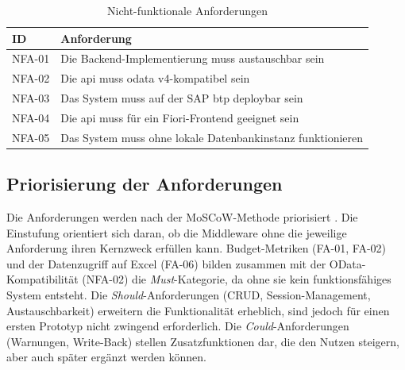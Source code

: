 \begin{table}[H]
\centering
\caption{Nicht-funktionale Anforderungen}
\label{tab:nfa}
\begin{tabularx}{\textwidth}{l>{\raggedright\arraybackslash}X}
\toprule
\textbf{ID} & \textbf{Anforderung} \\
\midrule
NFA-01 & Die Backend-Implementierung muss austauschbar sein \\
NFA-02 & Die \gls{api} muss \gls{odata} v4-kompatibel sein \\
NFA-03 & Das System muss auf der SAP \gls{btp} deploybar sein \\
NFA-04 & Die \gls{api} muss für ein Fiori-Frontend geeignet sein \\
NFA-05 & Das System muss ohne lokale Datenbankinstanz funktionieren \\
\bottomrule
\end{tabularx}
\end{table}

\subsection{Priorisierung der Anforderungen}

Die Anforderungen werden nach der MoSCoW-Methode priorisiert \citep{sommerville2015}. Die Einstufung orientiert sich daran, ob die Middleware ohne die jeweilige Anforderung ihren Kernzweck erfüllen kann. Budget-Metriken (FA-01, FA-02) und der Datenzugriff auf Excel (FA-06) bilden zusammen mit der OData-Kompatibilität (NFA-02) die \textit{Must}-Kategorie, da ohne sie kein funktionsfähiges System entsteht. Die \textit{Should}-Anforderungen (CRUD, Session-Management, Austauschbarkeit) erweitern die Funktionalität erheblich, sind jedoch für einen ersten Prototyp nicht zwingend erforderlich. Die \textit{Could}-Anforderungen (Warnungen, Write-Back) stellen Zusatzfunktionen dar, die den Nutzen steigern, aber auch später ergänzt werden können.

